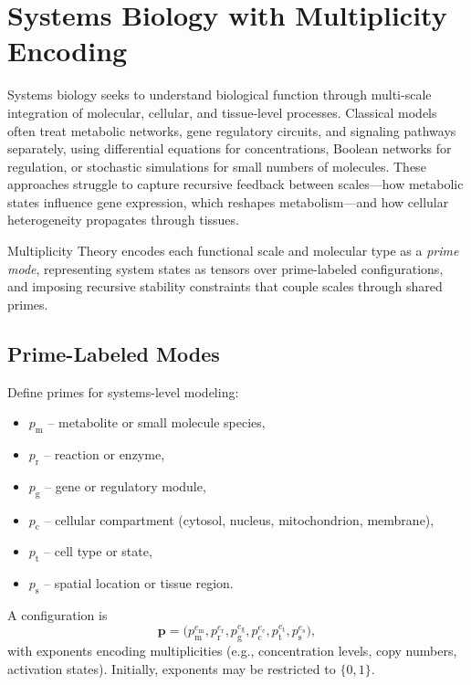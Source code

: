 \documentclass[11pt]{article}
\begin{document}
\section{Systems Biology with Multiplicity Encoding}
Systems biology seeks to understand biological function through multi-scale integration of molecular, cellular, and tissue-level processes. Classical models often treat metabolic networks, gene regulatory circuits, and signaling pathways separately, using differential equations for concentrations, Boolean networks for regulation, or stochastic simulations for small numbers of molecules. These approaches struggle to capture recursive feedback between scales---how metabolic states influence gene expression, which reshapes metabolism---and how cellular heterogeneity propagates through tissues.

Multiplicity Theory encodes each functional scale and molecular type as a \emph{prime mode}, representing system states as tensors over prime-labeled configurations, and imposing recursive stability constraints that couple scales through shared primes.

\subsection{Prime-Labeled Modes}
Define primes for systems-level modeling:
\begin{itemize}
    \item $p_{\text{m}}$ -- metabolite or small molecule species,
    \item $p_{\text{r}}$ -- reaction or enzyme,
    \item $p_{\text{g}}$ -- gene or regulatory module,
    \item $p_{\text{c}}$ -- cellular compartment (cytosol, nucleus, mitochondrion, membrane),
    \item $p_{\text{t}}$ -- cell type or state,
    \item $p_{\text{s}}$ -- spatial location or tissue region.
\end{itemize}
A configuration is
\[
\mathbf{p}
=
\big(
p_{\text{m}}^{e_{\text{m}}},
p_{\text{r}}^{e_{\text{r}}},
p_{\text{g}}^{e_{\text{g}}},
p_{\text{c}}^{e_{\text{c}}},
p_{\text{t}}^{e_{\text{t}}},
p_{\text{s}}^{e_{\text{s}}}
\big),
\]
with exponents encoding multiplicities (e.g., concentration levels, copy numbers, activation states). Initially, exponents may be restricted to $\{0,1\}$.
\end{document}
